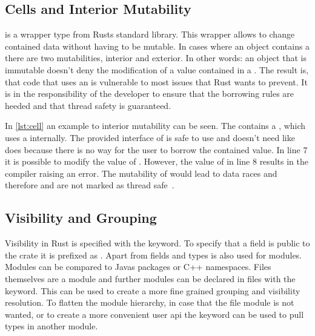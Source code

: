\documentclass[thesis]{subfiles}
\begin{document}
  \subsection{Cells and Interior Mutability}\label{sec:cell}
    \UnsafeCellT is a wrapper type from Rusts standard library.
    This wrapper allows to change contained data without having to be mutable.
    In cases where an object contains a \UnsafeCellT there are two mutabilities, interior and exterior.
    In other words: an object that is immutable doesn't deny the modification of a value contained in a \UnsafeCellT.
    The result is, that code that uses an \UnsafeCellT is vulnerable to most issues that Rust wants to prevent.
    It is in the responsibility of the developer to ensure that the borrowing rules are heeded and that thread safety is guaranteed.%
    ~\autocite[std::cell]{rust-doc}


    In \autoref{lst:cell} an example to interior mutability can be seen.
    The \struct \Foo contains a \CellT, which uses a \UnsafeCellT internally.
    The provided interface of \CellT is safe to use and doesn't need \unsafe like \UnsafeCellT does because there is no way for the user to borrow the contained value.
    In line 7 it is possible to modify the value of \x.
    However, the value of \y in line 8 results in the compiler raising an error.
    The mutability of \x would lead to data races and therefore \CellT and \RefCellT are not marked as thread safe~\autocites[std::cell]{rust-doc}[Send and Sync]{rust-nom}.

  \subsection{Visibility and Grouping}
    Visibility in Rust is specified with the \pub keyword.
    To specify that a field is public to the crate it is prefixed as .
    Apart from fields and types \pub is also used for modules.
    Modules can be compared to Javas packages or C++ namespaces.
    Files themselves are a module and further modules can be declared in files with the \mod keyword.
    This can be used to create a more fine grained grouping and visibility resolution.
    To flatten the module hierarchy, in case that the file module is not wanted, or to create a more convenient user \gls{api} the \use keyword can be used to pull types in another module.%
    ~\autocite[Visibility and Privacy, Use declarations]{rust-ref}
\end{document}
